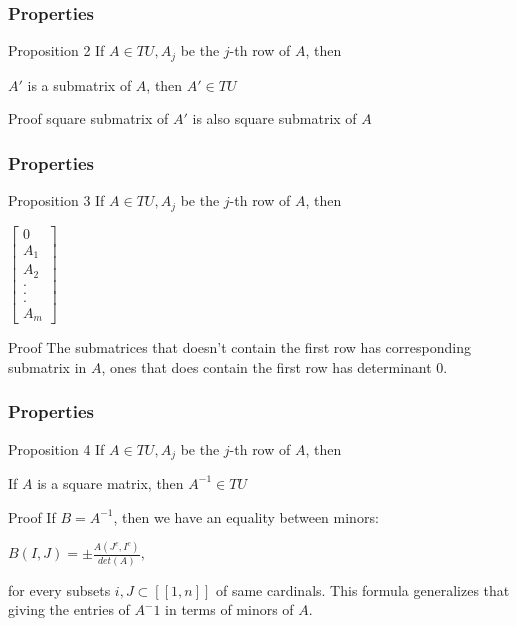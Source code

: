 \documentclass{beamer}
\begin{document}
\begin{frame}\frametitle{Properties}
\begin{block}{Proposition 2}
If $A \in TU, A_j$ be the $j$-th row of $A$, then \\
\centerline{$A'$ is a submatrix of $A$, then $A' \in TU$}
\end{block}
\begin{block}{Proof}
square submatrix of $A'$ is also square submatrix of $A$
\end{block}
\end{frame}

\begin{frame}\frametitle{Properties}
\begin{block}{Proposition 3}
If $A \in TU, A_j$ be the $j$-th row of $A$, then \\
\centerline{$\begin{bmatrix}
0 \\
A_1 \\
A_2 \\
. \\
. \\
. \\
A_m
\end{bmatrix}$}
\end{block}
\begin{block}{Proof}
The submatrices that doesn't contain the first row has corresponding submatrix in $A$, ones that does contain the first row has determinant 0.
\end{block}
\end{frame}

\begin{frame}\frametitle{Properties}
\begin{block}{Proposition 4}
If $A \in TU, A_j$ be the $j$-th row of $A$, then \\
\centerline{If $A$ is a square matrix, then $A^{-1} \in TU$}
\end{block}
\begin{block}{Proof}
If $B = A^{-1}$, then we have an equality between minors: \\
\centerline{$B(I, J) = \pm \frac{A(J^c, I^c)}{det(A)},$}
for every subsets $i, J \subset [[1, n]]$ of same cardinals. This formula generalizes that giving the entries of $A^−1$ in terms of minors of $A$.
\end{block}
\end{frame}
\end{document}
